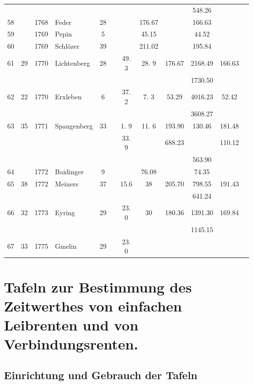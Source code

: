 \documentclass[12pt,a4paper]{article}
\begin{document}
\begin{center}
\begin{longtable}{|c|c|c|l|c|c|c|c|c|c|c|c|}
 & & & & & & & & & 548.26 & \\
58 & & 1768 & Feder & 28 & & & 176.67 & & 166.63 & \\
59 & & 1769 & Pepin & 5 & & & 45.15 & & 44.52 & \\
60 & & 1769 & Schlözer & 39 & & & 211.02 & & 195.84 & \\
61 & 29 & 1770 & Lichtenberg & 28 & & 49. 3 & 28. 9 & 176.67 & 2168.49 & 166.63 \\
 & & & & & & & & & 1730.50 & \\
62 & 22 & 1770 & Erxleben & 6 & & 37. 2 & 7. 3 & 53.29 & 4016.23 & 52.42 \\
 & & & & & & & & & 3608.27 & \\
63 & 35 & 1771 & Spangenberg & 33 & & 1. 9 & 11. 6 & 193.90 & 130.46 & 181.48 \\
 & & & & & & 33. 9 & & 688.23 & & 110.12 \\
 & & & & & & & & & 563.90 & \\
64 & & 1772 & Baidinger & 9 & & & 76.08 & & 74.35 & \\
65 & 38 & 1772 & Meiners & 37 & & 15.6 & 38 & 205.70 & 798.55 & 191.43 \\
 & & & & & & & & & 641.24 & \\
66 & 32 & 1773 & Eyring & 29 & & 23. 0 & 30 & 180.36 & 1391.30 & 169.84 \\
 & & & & & & & & & 1145.15 & \\
67 & 33 & 1775 & Gmelin & 29 & & 23. 0 & & & & \\
\hline
\end{longtable}
\end{center}

\section*{Tafeln zur Bestimmung des Zeitwerthes von einfachen Leibrenten und von Verbindungsrenten.}

\subsection*{Einrichtung und Gebrauch der Tafeln}
\end{document}
